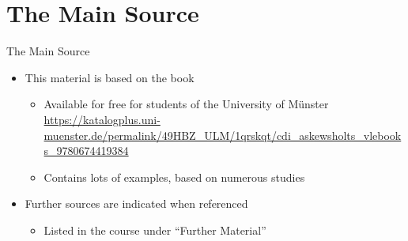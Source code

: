 \documentclass{ercisbeamer}
\begin{document}
\section{The Main Source}
\begin{frame}{The Main Source}
    \begin{itemize}
        \item This material is based on the book 
        \begin{itemize}
            \item Available for free for students of the University of Münster  \\ \url{https://katalogplus.uni-muenster.de/permalink/49HBZ_ULM/1qrskqt/cdi_askewsholts_vlebooks_9780674419384}
            \item Contains lots of examples, based on numerous studies
        \end{itemize}
        \item Further sources are indicated when referenced
        \begin{itemize}
            \item Listed in the course under ``Further Material''
        \end{itemize}
    \end{itemize}


\end{frame}
\end{document}
